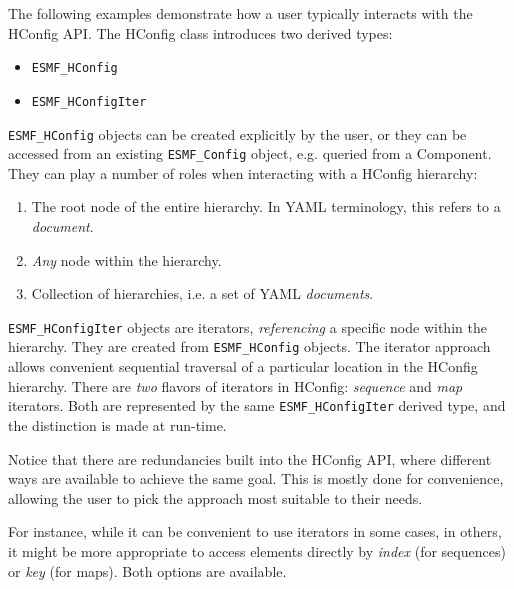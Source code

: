 
The following examples demonstrate how a user typically interacts with the
HConfig API. The HConfig class introduces two derived types:
\begin{itemize}
\item {\tt ESMF\_HConfig}
\item {\tt ESMF\_HConfigIter}
\end{itemize}

{\tt ESMF\_HConfig} objects can be created explicitly by the user, or they
can be accessed from an existing {\tt ESMF\_Config} object, e.g. queried from
a Component. They can play a number of roles when interacting with
a HConfig hierarchy:

\begin{enumerate}
\item The root node of the entire hierarchy. In YAML terminology, this
refers to a {\em document}.
\item {\em Any} node within the hierarchy.
\item Collection of hierarchies, i.e. a set of YAML {\em documents}.
\end{enumerate}

{\tt ESMF\_HConfigIter} objects are iterators, {\em referencing} a specific
node within the hierarchy. They are created from {\tt ESMF\_HConfig} objects.
The iterator approach allows convenient sequential traversal of a particular
location in the HConfig hierarchy. There are {\em two} flavors of iterators in
HConfig: {\em sequence} and {\em map} iterators.
Both are represented by the same {\tt ESMF\_HConfigIter} derived type, and the
distinction is made at run-time.

Notice that there are redundancies built into the HConfig API, where different
ways are available to achieve the same goal. This is mostly done for
convenience, allowing the user to pick the approach most suitable to their
needs.

For instance, while it can be convenient to use iterators in some cases, in
others, it might be more appropriate to access elements directly by {\em index}
(for sequences) or {\em key} (for maps). Both options are available.


